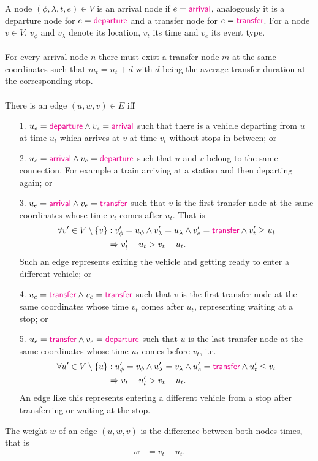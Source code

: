 \begin{mydef}
		A node $(\phi, \lambda, t, e) \in V$ is an \textnormal{arrival node} if $e = \textcolor{magenta}{\textsf{arrival}}$, analogously it is a
		\textnormal{departure node} for $e = \textcolor{magenta}{\textsf{departure}}$ and a transfer node for $e = \textcolor{magenta}{\textsf{transfer}}$.
		For a node $v \in V$, $v_\phi$ and $v_\lambda$ denote its location, $v_t$  its time and $v_e$ its event type.\\\\
		For every arrival node $n$ there must exist a transfer node $m$ at the same coordinates such that $m_t = n_t + d$
		with $d$ being the average transfer duration at the corresponding stop.\\\\
		There is an edge $(u, w, v) \in E$ iff
		\begin{itemize}
			\item[1.] $u_e = \textcolor{magenta}{\textsf{departure}} \land v_e = \textcolor{magenta}{\textsf{arrival}}$ such that there is a vehicle departing
				from $u$ at time $u_t$ which arrives at $v$ at time $v_t$ without stops in between; or
			\item[2.] $u_e = \textcolor{magenta}{\textsf{arrival}} \land v_e = \textcolor{magenta}{\textsf{departure}}$
				such that $u$ and $v$ belong to the same connection. For example a train arriving at a station
				and then departing again; or
			\item[3.] $u_e = \textcolor{magenta}{\textsf{arrival}} \land v_e = \textcolor{magenta}{\textsf{transfer}}$
				such that $v$ is the first transfer node at the same coordinates whose time $v_t$ comes after $u_t$. That is
				\begin{align*}
					\forall v' \in V \setminus \{v\}	&: v'_\phi = u_\phi \land v'_\lambda = u_\lambda \land v'_e = \textcolor{magenta}{\textsf{transfer}} \land v'_t \ge u_t\\
										&\Rightarrow v'_t - u_t > v_t - u_t.
				\end{align*}
				Such an edge represents exiting the vehicle and getting ready to enter a different vehicle; or
			\item[4.] $u_e = \textcolor{magenta}{\textsf{transfer}} \land v_e = \textcolor{magenta}{\textsf{transfer}}$
				such that $v$ is the first transfer node at the same coordinates whose time $v_t$ comes after $u_t$,
				representing waiting at a stop; or
			\item[5.] $u_e = \textcolor{magenta}{\textsf{transfer}} \land v_e = \textcolor{magenta}{\textsf{departure}}$
				such that $u$ is the last transfer node at the same coordinates whose time $u_t$ comes before $v_t$, i.e.
				\begin{align*}
					\forall u' \in V \setminus \{u\}	&: u'_\phi = v_\phi \land u'_\lambda = v_\lambda \land u'_e = \textcolor{magenta}{\textsf{transfer}} \land u'_t \le v_t\\
										&\Rightarrow v_t - u'_t > v_t - u_t.
				\end{align*}
				An edge like this represents entering a different vehicle from a stop after transferring or waiting at the stop.
		\end{itemize}
		The weight $w$ of an edge $(u, w, v)$ is the difference between both nodes times, that is
		\begin{align*}
			w	&= v_t - u_t.
		\end{align*}
	\end{mydef}
